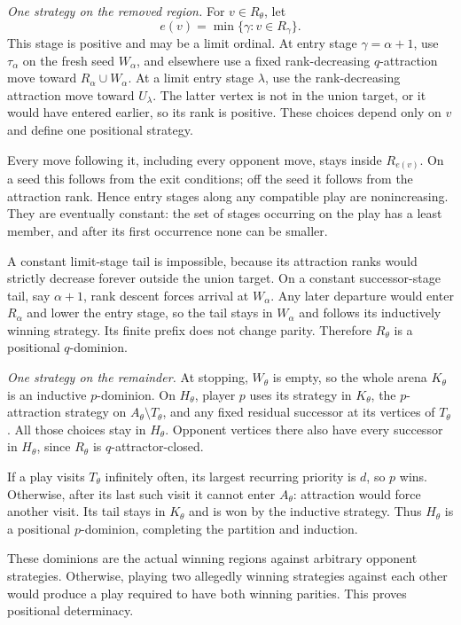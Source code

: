 \emph{One strategy on the removed region.}
For \(v\in R_\theta\), let
\[
 e(v)=\min\{\gamma:v\in R_\gamma\}.
\]
This stage is positive and may be a
limit ordinal. At entry stage
\(\gamma=\alpha+1\), use
\(\tau_\alpha\) on the fresh seed
\(W_\alpha\), and elsewhere use a
fixed rank-decreasing \(q\)-attraction
move toward \(R_\alpha\cup W_\alpha\).
At a limit entry stage \(\lambda\),
use the rank-decreasing attraction
move toward \(U_\lambda\).
The latter vertex is not in the union
target, or it would have entered
earlier, so its rank is positive.
These choices depend only on \(v\)
and define one positional strategy.

Every move following it, including
every opponent move, stays inside
\(R_{e(v)}\). On a seed this follows
from the exit conditions; off the
seed it follows from the attraction
rank. Hence entry stages along any
compatible play are nonincreasing.
They are eventually constant:
the set of stages occurring on the
play has a least member, and after
its first occurrence none can be
smaller.

A constant limit-stage tail is
impossible, because its attraction
ranks would strictly decrease
forever outside the union target.
On a constant successor-stage
tail, say \(\alpha+1\), rank
descent forces arrival at
\(W_\alpha\). Any later departure
would enter \(R_\alpha\) and
lower the entry stage, so the
tail stays in \(W_\alpha\) and
follows its inductively winning
strategy. Its finite prefix does
not change parity. Therefore
\(R_\theta\) is a positional
\(q\)-dominion.

\emph{One strategy on the remainder.}
At stopping, \(W_\theta\) is empty,
so the whole arena \(K_\theta\)
is an inductive \(p\)-dominion.
On \(H_\theta\), player \(p\)
uses its strategy in \(K_\theta\),
the \(p\)-attraction strategy
on \(A_\theta\setminus T_\theta\),
and any fixed residual successor
at its vertices of \(T_\theta\).
All those choices stay in
\(H_\theta\). Opponent vertices
there also have every successor
in \(H_\theta\), since
\(R_\theta\) is \(q\)-attractor-closed.

If a play visits \(T_\theta\)
infinitely often, its largest
recurring priority is \(d\),
so \(p\) wins. Otherwise,
after its last such visit it
cannot enter \(A_\theta\):
attraction would force another
visit. Its tail stays in
\(K_\theta\) and is won by the
inductive strategy. Thus
\(H_\theta\) is a positional
\(p\)-dominion, completing the
partition and induction.

These dominions are the actual
winning regions against arbitrary
opponent strategies. Otherwise,
playing two allegedly winning
strategies against each other
would produce a play required
to have both winning parities.
This proves positional determinacy.

